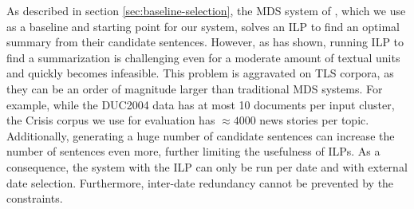 \documentclass[a4paper,BCOR=10mm]{report}
\numberwithin{lemma}{chapter}
\numberwithin{definition}{chapter}
\begin{document}
%
%
%
%
%
%
%
%
%
%

As described in section \ref{sec:baseline-selection}, the MDS system of \citet{banerjee}, which we use as a baseline and starting point for our system, solves an ILP to find an optimal summary from their candidate sentences.
However, as \citet{mcdonald} has shown, running ILP to find a summarization is challenging even for a moderate amount of textual units and quickly becomes infeasible.
This problem is aggravated on TLS corpora, as they can be an order of magnitude larger than traditional MDS systems. For example, while the DUC2004 data has at most 10 documents per input cluster, the Crisis corpus we use for evaluation has $\approx 4000$ news stories per topic. Additionally, generating a huge number of candidate sentences can increase the number of sentences even more, further limiting the usefulness of ILPs. As a consequence, the system with the ILP can only be run per date and with external date selection. Furthermore, inter-date redundancy cannot be prevented by the constraints.
\end{document}
